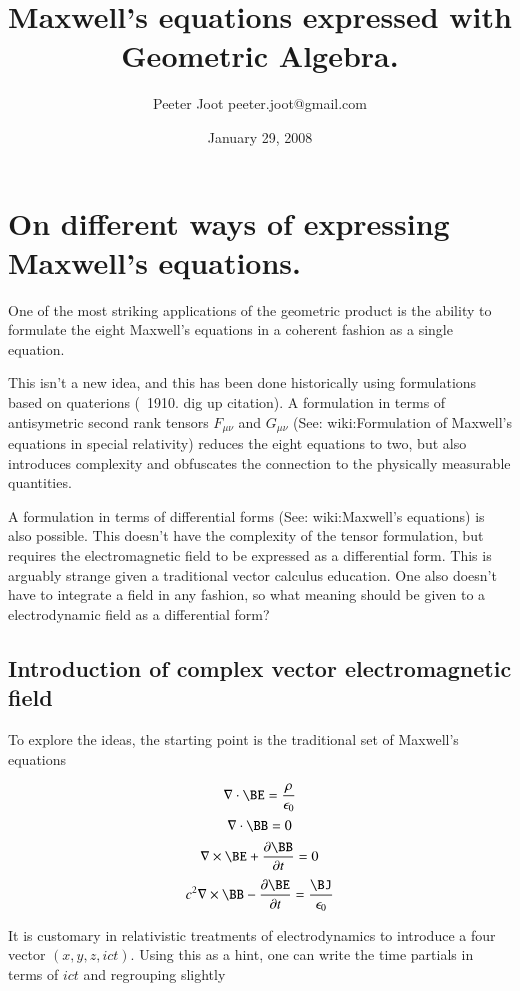 \documentclass{article}      %
\title{Maxwell's equations expressed with Geometric Algebra.} %
\author{Peeter Joot \quad peeter.joot@gmail.com}         %
\date{January 29, 2008}        %
\begin{document}

\maketitle{}

\section{On different ways of expressing Maxwell's equations.}

One of the most striking applications of the geometric product is the ability to formulate the eight Maxwell's equations in a coherent fashion as a single equation.

This isn't a new idea, and this has been done historically using formulations based on quaterions (~1910.  dig up citation).  A formulation in terms of antisymetric second rank tensors $F_{\mu \nu}$ and $G_{\mu \nu}$ (See: wiki:Formulation of Maxwell's equations in special relativity) reduces the eight equations to two, but also introduces complexity and obfuscates the connection to the physically measurable quantities.

A formulation in terms of differential forms (See: wiki:Maxwell's equations) is also possible.  This doesn't have the complexity of the tensor formulation, but requires the electromagnetic field to be expressed as a differential form.  This is arguably strange given a traditional vector calculus education.  One also doesn't have to integrate a field in any fashion, so what meaning should be given to a electrodynamic field as a differential form?

\subsection{Introduction of complex vector electromagnetic field }

To explore the ideas, the starting point is the traditional set of Maxwell's equations

\[
\nabla \cdot \BE  = \frac {\rho} {\epsilon_0}
\]
\[
\nabla \cdot \BB  = 0
\]
\[
\nabla \times \BE  +\frac{\partial \BB } {\partial t} = 0
\]
\[
c^2 \nabla \times \BB  - \frac{\partial \BE } {\partial t}
= \frac{\BJ}{\epsilon_0}
\]

It is customary in relativistic treatments of electrodynamics to introduce a four vector $(x, y, z, ict)$.  Using this as a hint, one can write the time partials in terms of $ict$ and regrouping slightly
\end{document}
